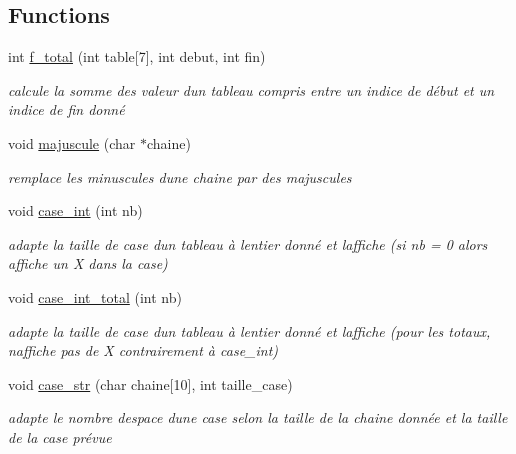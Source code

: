 \subsection*{Functions}
\begin{DoxyCompactItemize}
\item 
int \mbox{\hyperlink{yams___cleo___martin-_colleu__2_80_8c_acade0b64e6667900df67784719f6d91b}{f\+\_\+total}} (int table\mbox{[}7\mbox{]}, int debut, int fin)
\begin{DoxyCompactList}\small\item\em calcule la somme des valeur d\textquotesingle{}un tableau compris entre un indice de début et un indice de fin donné \end{DoxyCompactList}\item 
void \mbox{\hyperlink{yams___cleo___martin-_colleu__2_80_8c_a5bbcd4c6c5a2425d5de6877bdfcf7b55}{majuscule}} (char $\ast$chaine)
\begin{DoxyCompactList}\small\item\em remplace les minuscules d\textquotesingle{}une chaine par des majuscules \end{DoxyCompactList}\item 
void \mbox{\hyperlink{yams___cleo___martin-_colleu__2_80_8c_ae0d4fb89370e27251e605e929c9af0bf}{case\+\_\+int}} (int nb)
\begin{DoxyCompactList}\small\item\em adapte la taille de case d\textquotesingle{}un tableau à l\textquotesingle{}entier donné et l\textquotesingle{}affiche (si nb = 0 alors affiche un X dans la case) \end{DoxyCompactList}\item 
void \mbox{\hyperlink{yams___cleo___martin-_colleu__2_80_8c_ad2143ef8ea16cfc017c7f006af3385cb}{case\+\_\+int\+\_\+total}} (int nb)
\begin{DoxyCompactList}\small\item\em adapte la taille de case d\textquotesingle{}un tableau à l\textquotesingle{}entier donné et l\textquotesingle{}affiche (pour les totaux, n\textquotesingle{}affiche pas de X contrairement à case\+\_\+int) \end{DoxyCompactList}\item 
void \mbox{\hyperlink{yams___cleo___martin-_colleu__2_80_8c_a7cfeb8762d6de0ebff12f95682f49806}{case\+\_\+str}} (char chaine\mbox{[}10\mbox{]}, int taille\+\_\+case)
\begin{DoxyCompactList}\small\item\em adapte le nombre d\textquotesingle{}espace d\textquotesingle{}une case selon la taille de la chaine donnée et la taille de la case prévue \end{DoxyCompactList}\item 

\end{DoxyCompactItemize}
